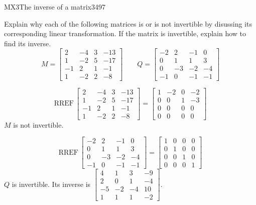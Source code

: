 \begin{exercise}{MX3}{The inverse of a matrix}{3497} 
\begin{exerciseStatement} 

 Explain why each of the following matrices is or is not invertible by disussing its corresponding linear transformation. If the matrix is invertible, explain how to find its inverse. \[
\hspace{2em}
M = \left[\begin{array}{cccc}
2 & -4 & 3 & -13 \\
1 & -2 & 5 & -17 \\
-1 & 2 & 1 & -1 \\
1 & -2 & 2 & -8
\end{array}\right]
\hspace{2em}
Q = \left[\begin{array}{cccc}
-2 & 2 & -1 & 0 \\
0 & 1 & 1 & 3 \\
0 & -3 & -2 & -4 \\
-1 & 0 & -1 & -1
\end{array}\right]
\hspace{2em}
        \] 

 \end{exerciseStatement}
 \begin{exerciseAnswer} 

 \[\mathrm{RREF}\,\left[\begin{array}{cccc}
2 & -4 & 3 & -13 \\
1 & -2 & 5 & -17 \\
-1 & 2 & 1 & -1 \\
1 & -2 & 2 & -8
\end{array}\right]=\left[\begin{array}{cccc}
1 & -2 & 0 & -2 \\
0 & 0 & 1 & -3 \\
0 & 0 & 0 & 0 \\
0 & 0 & 0 & 0
\end{array}\right]\] \(M\) is not invertible. 

 

 \[\mathrm{RREF}\,\left[\begin{array}{cccc}
-2 & 2 & -1 & 0 \\
0 & 1 & 1 & 3 \\
0 & -3 & -2 & -4 \\
-1 & 0 & -1 & -1
\end{array}\right]=\left[\begin{array}{cccc}
1 & 0 & 0 & 0 \\
0 & 1 & 0 & 0 \\
0 & 0 & 1 & 0 \\
0 & 0 & 0 & 1
\end{array}\right]\] \(Q\) is invertible. Its inverse is \(\left[\begin{array}{cccc}
4 & 1 & 3 & -9 \\
2 & 0 & 1 & -4 \\
-5 & -2 & -4 & 10 \\
1 & 1 & 1 & -2
\end{array}\right]\). 

 \end{exerciseAnswer}
 \end{exercise}


